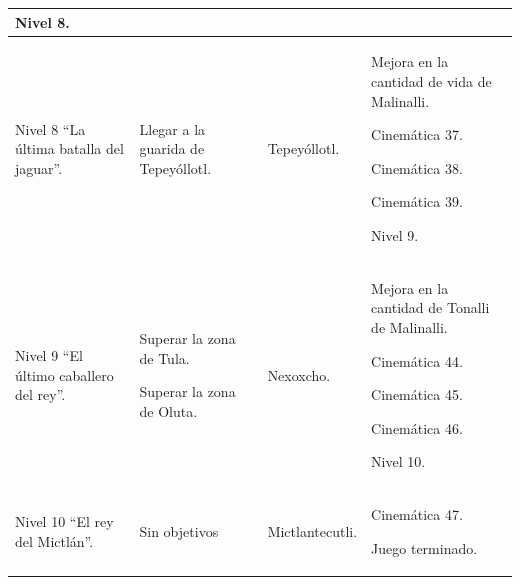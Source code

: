 \begin{longtable}[c]{ | m{3.75cm} | m{3.75cm}| m{3.75cm} | m{3.75cm}|}
		Nivel 8.		 
		 \\ 
		\hline
		Nivel 8 “La última batalla del jaguar”. & 
		Llegar a la guarida de Tepeyóllotl.&
		Tepeyóllotl. &
		Mejora en la cantidad de vida de Malinalli.
		\par		
		Cinemática 37.
		\par
		Cinemática 38.
		\par
		Cinemática 39.
		\par
		Nivel 9.		 
		 \\ 
		\hline
		Nivel 9 “El último caballero del rey”. & 
		Superar la zona de Tula.
		\par
		Superar la zona de Oluta.&
		Nexoxcho. &
		Mejora en la cantidad de Tonalli de Malinalli.
		\par		
		Cinemática 44.
		\par
		Cinemática 45.
		\par
		Cinemática 46.
		\par
		Nivel 10. 
		 \\ 
		\hline
		Nivel 10 “El rey del Mictlán”. & 
		Sin objetivos &
		Mictlantecutli. &
		Cinemática 47.
		\par		
		Juego terminado. 
		 \\ 
		\hline
	\end{longtable}

